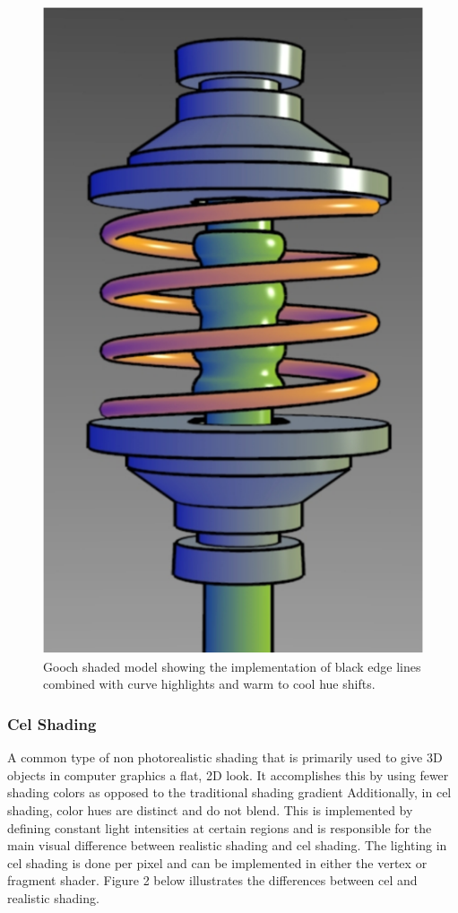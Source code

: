 \documentclass[10pt,journal,compsoc,draftclsnofoot]{IEEEtran}
\begin{document}
\begin{figure} [H]
  \includegraphics[scale=0.5]{one.eps}
  \caption
{ \newline \hspace{\linewidth}
Gooch shaded model showing the implementation of black edge lines combined with curve highlights and warm to cool hue shifts.}
  \label{fig:one}
\end{figure}

\subsubsection{Cel Shading}
A common type of non photorealistic shading that is primarily used to give 3D objects in computer graphics a flat, 2D look. 
It accomplishes this by using fewer shading colors as opposed to the traditional shading gradient
Additionally, in cel shading, color hues are distinct and do not blend. \cite{celshading}
This is implemented by defining constant light intensities at certain regions and is responsible for the main visual difference between realistic shading and cel shading. 
The lighting in cel shading is done per pixel and can be implemented in either the vertex or fragment shader. \cite{nonphotshading} 
Figure 2 below illustrates the differences between cel and realistic shading.
\end{document}
